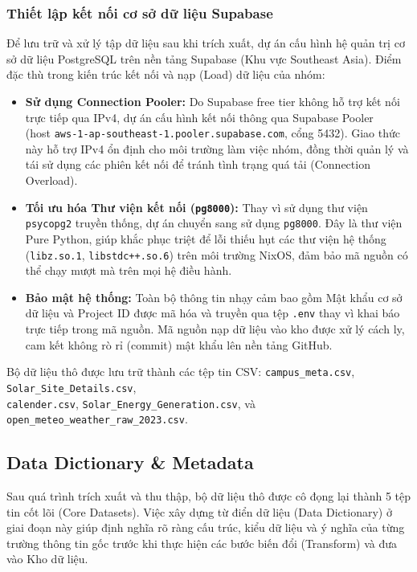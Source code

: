 \documentclass[12pt,a4paper]{article}
\begin{document}
\subsubsection{Thiết lập kết nối cơ sở dữ liệu Supabase}
Để lưu trữ và xử lý tập dữ liệu sau khi trích xuất, dự án cấu hình hệ quản trị cơ sở dữ liệu PostgreSQL trên nền tảng Supabase (Khu vực Southeast Asia). Điểm đặc thù trong kiến trúc kết nối và nạp (Load) dữ liệu của nhóm:
\begin{itemize}
    \item \textbf{Sử dụng Connection Pooler:} Do Supabase free tier không hỗ trợ kết nối trực tiếp qua IPv4, dự án cấu hình kết nối thông qua Supabase Pooler \\(host \texttt{aws-1-ap-southeast-1.pooler.supabase.com}, cổng 5432). Giao thức này hỗ trợ IPv4 ổn định cho môi trường làm việc nhóm, đồng thời quản lý và tái sử dụng các phiên kết nối để tránh tình trạng quá tải (Connection Overload).
    \item \textbf{Tối ưu hóa Thư viện kết nối (\texttt{pg8000}):} Thay vì sử dụng thư viện \texttt{psycopg2} truyền thống, dự án chuyển sang sử dụng \texttt{pg8000}. Đây là thư viện Pure Python, giúp khắc phục triệt để lỗi thiếu hụt các thư viện hệ thống (\texttt{libz.so.1}, \texttt{libstdc++.so.6}) trên môi trường NixOS, đảm bảo mã nguồn có thể chạy mượt mà trên mọi hệ điều hành.
    \item \textbf{Bảo mật hệ thống:} Toàn bộ thông tin nhạy cảm bao gồm Mật khẩu cơ sở dữ liệu và Project ID được mã hóa và truyền qua tệp \texttt{.env} thay vì khai báo trực tiếp trong mã nguồn. Mã nguồn nạp dữ liệu vào kho được xử lý cách ly, cam kết không rò rỉ (commit) mật khẩu lên nền tảng GitHub.
\end{itemize}
Bộ dữ liệu thô được lưu trữ thành các tệp tin CSV: \texttt{campus\_meta.csv}, \texttt{Solar\_Site\_Details.csv},\\ \texttt{calender.csv}, \texttt{Solar\_Energy\_Generation.csv}, và \texttt{open\_meteo\_weather\_raw\_2023.csv}.

\subsection{Data Dictionary \& Metadata}
\label{sec:data_dictionary}

Sau quá trình trích xuất và thu thập, bộ dữ liệu thô được cô đọng lại thành 5 tệp tin cốt lõi (Core Datasets). Việc xây dựng từ điển dữ liệu (Data Dictionary) ở giai đoạn này giúp định nghĩa rõ ràng cấu trúc, kiểu dữ liệu và ý nghĩa của từng trường thông tin gốc trước khi thực hiện các bước biến đổi (Transform) và đưa vào Kho dữ liệu.
\end{document}
